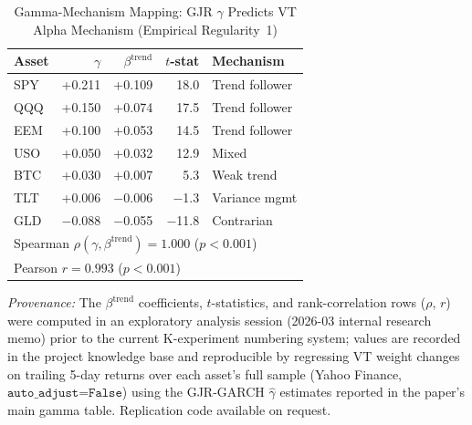 \begin{table}[H]
\centering
\caption{Gamma-Mechanism Mapping: GJR $\gamma$ Predicts VT Alpha Mechanism (Empirical Regularity~1)}
\label{tab:gamma-mechanism}
\begin{tabular}{lrrrl}
\toprule
Asset & $\gamma$ & $\beta^{\text{trend}}$ & $t$-stat & Mechanism \\
\midrule
SPY & +0.211 & +0.109 & 18.0 & Trend follower \\
QQQ & +0.150 & +0.074 & 17.5 & Trend follower \\
EEM & +0.100 & +0.053 & 14.5 & Trend follower \\
USO & +0.050 & +0.032 & 12.9 & Mixed \\
BTC & +0.030 & +0.007 & 5.3 & Weak trend \\
TLT & +0.006 & $-$0.006 & $-$1.3 & Variance mgmt \\
GLD & $-$0.088 & $-$0.055 & $-$11.8 & Contrarian \\
\midrule
\multicolumn{5}{l}{Spearman $\rho(\gamma, \beta^{\text{trend}}) = 1.000$ ($p < 0.001$)} \\
\multicolumn{5}{l}{Pearson $r = 0.993$ ($p < 0.001$)} \\
\bottomrule
\end{tabular}

\vspace{4pt}
\raggedright\footnotesize
\textit{Provenance:} The $\beta^{\text{trend}}$ coefficients, $t$-statistics, and rank-correlation rows ($\rho$, $r$) were computed in an exploratory analysis session (2026-03 internal research memo) prior to the current K-experiment numbering system; values are recorded in the project knowledge base and reproducible by regressing VT weight changes on trailing 5-day returns over each asset's full sample (Yahoo Finance, $\texttt{auto\_adjust=False}$) using the GJR-GARCH $\hat{\gamma}$ estimates reported in the paper's main gamma table. Replication code available on request.
\end{table}
